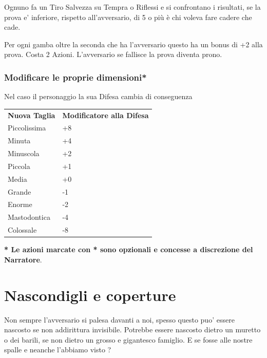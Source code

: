 \documentclass[a4paper,11pt,twoside,openany]{book}
\begin{document}
Ognuno fa un Tiro Salvezza su Tempra o Riflessi e si confrontano i risultati, se la prova e' inferiore, rispetto all'avversario, di 5 o più è chi voleva fare cadere che cade.

Per ogni gamba oltre la seconda che ha l'avversario questo ha un bonus di +2 alla prova. Costa 2 Azioni. L'avversario se fallisce la prova diventa prono.

\subsubsection{Modificare le proprie dimensioni*}

Nel caso il personaggio  la sua Difesa cambia di conseguenza

\bigskip

\begin{tabular}{ll}
	\toprule
	\textbf{Nuova Taglia} & \textbf{Modificatore alla Difesa}\\
	Piccolissima          & +8\\
	Minuta                & +4\\
	Minuscola             & +2\\
	Piccola               & +1\\
	Media                 & +0\\
	Grande                & -1\\
	Enorme                & -2\\
	Mastodontica          & -4\\
	Colossale             & -8\\
\end{tabular}

\bigskip

\textbf{{*} Le azioni marcate con {*} sono opzionali e concesse a
	discrezione del Narratore}.

\pagebreak

\section{Nascondigli e coperture}

\label{nascondigli-e-coperture}
Non sempre l'avversario si palesa davanti a noi, spesso questo puo' essere nascosto se non addirittura invisibile.
Potrebbe essere nascosto dietro un muretto o dei barili, se non dietro un grosso e gigantesco famiglio.
E se fosse alle nostre spalle e neanche l'abbiamo visto ?
\end{document}
